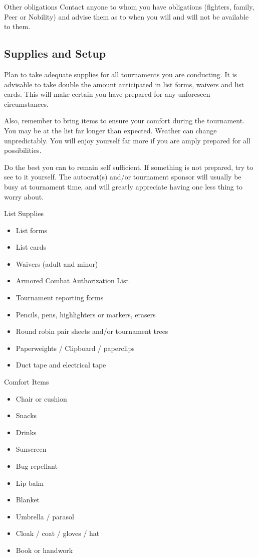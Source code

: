 \documentclass{article}
\begin{document}
Other obligations Contact anyone to whom you have obligations (fighters, family, Peer
or Nobility) and advise them as to when you will and will not be
available to them.

\subsection{Supplies and Setup}
Plan to take adequate supplies for all tournaments you are conducting. It is advisable to take double the
amount anticipated in list forms, waivers and list cards. This will make certain you have prepared for any
unforeseen circumstances.

Also, remember to bring items to ensure your comfort during the tournament. You may be at the list far
longer than expected. Weather can change unpredictably. You will enjoy yourself far more if you are
amply prepared for all possibilities.

Do the best you can to remain self sufficient. If something is not prepared, try to see to it yourself. The
autocrat(s) and/or tournament sponsor will usually be busy at tournament time, and will greatly appreciate
having one less thing to worry about.

List Supplies
\begin{itemize}
\item List forms
\item List cards
\item Waivers (adult and minor)
\item Armored Combat Authorization List
\item Tournament reporting forms
\item Pencils, pens, highlighters or markers, erasers
\item Round robin pair sheets and/or tournament trees
\item Paperweights / Clipboard / paperclips
\item Duct tape and electrical tape
\end{itemize}

Comfort Items
\begin{itemize}
\item Chair or cushion
\item Snacks
\item Drinks
\item Sunscreen
\item Bug repellant
\item Lip balm
\item Blanket
\item Umbrella / parasol
\item Cloak / coat / gloves / hat
\item Book or handwork
\end{itemize}
\end{document}
